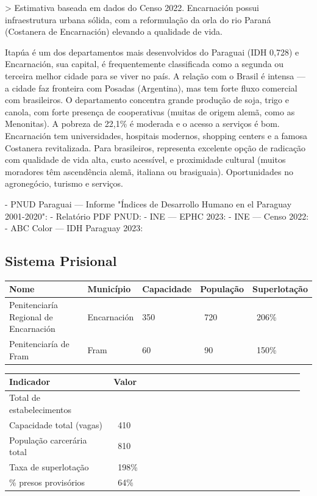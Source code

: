 > Estimativa baseada em dados do Censo 2022. Encarnación possui infraestrutura urbana sólida, com a reformulação da orla do rio Paraná (Costanera de Encarnación) elevando a qualidade de vida.


Itapúa é um dos departamentos mais desenvolvidos do Paraguai (IDH 0,728) e Encarnación, sua capital, é frequentemente classificada como a segunda ou terceira melhor cidade para se viver no país. A relação com o Brasil é intensa --- a cidade faz fronteira com Posadas (Argentina), mas tem forte fluxo comercial com brasileiros. O departamento concentra grande produção de soja, trigo e canola, com forte presença de cooperativas (muitas de origem alemã, como as Menonitas). A pobreza de 22,1\% é moderada e o acesso a serviços é bom. Encarnación tem universidades, hospitais modernos, shopping centers e a famosa Costanera revitalizada. Para brasileiros, representa excelente opção de radicação com qualidade de vida alta, custo acessível, e proximidade cultural (muitos moradores têm ascendência alemã, italiana ou brasiguaia). Oportunidades no agronegócio, turismo e serviços.


- PNUD Paraguai --- Informe "Índices de Desarrollo Humano en el Paraguay 2001-2020": 
- Relatório PDF PNUD: 
- INE --- EPHC 2023: 
- INE --- Censo 2022: 
- ABC Color --- IDH Paraguay 2023: 


\subsection{Sistema Prisional}



{\small
\setlength{\tabcolsep}{3pt}
\renewcommand{\arraystretch}{1.12}
{\small
\begin{tabularx}{\linewidth}{lXXXX}
\toprule
Nome & Município & Capacidade & População & Superlotação \\
\midrule
Penitenciaría Regional de Encarnación & Encarnación & 350 & ~720 & ~206\% \\
Penitenciaría de Fram & Fram & 60 & ~90 & ~150\% \\
\bottomrule
\end{tabularx}
}
}


{\small
\setlength{\tabcolsep}{3pt}
\renewcommand{\arraystretch}{1.12}
\begin{tabularx}{\linewidth}{>{\raggedright\arraybackslash}p{0.34\linewidth} >{\raggedright\arraybackslash}p{0.62\linewidth}}
\toprule
Indicador & Valor \\
\midrule
Total de estabelecimentos & 2 \\
Capacidade total (vagas) & ~410 \\
População carcerária total & ~810 \\
Taxa de superlotação & ~198\% \\
\% presos provisórios & ~64\% \\
\bottomrule
\end{tabularx}
}


